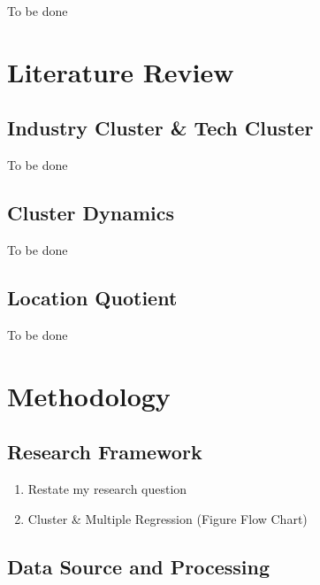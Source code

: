 \documentclass[
  12pt,
  oneside]{book}
\providecommand{\tightlist}{%
  \setlength{\itemsep}{0pt}\setlength{\parskip}{0pt}}
\begin{document}
To be done

\hypertarget{lit_review}{%
\chapter{Literature Review}\label{lit_review}}

\hypertarget{industry-cluster-tech-cluster}{%
\section{Industry Cluster \& Tech Cluster}\label{industry-cluster-tech-cluster}}

To be done

\hypertarget{cluster-dynamics}{%
\section{Cluster Dynamics}\label{cluster-dynamics}}

To be done

\hypertarget{location-quotient}{%
\section{Location Quotient}\label{location-quotient}}

To be done

\hypertarget{methodology}{%
\chapter{Methodology}\label{methodology}}

\hypertarget{research-framework}{%
\section{Research Framework}\label{research-framework}}

\begin{enumerate}
\def\labelenumi{\arabic{enumi}.}
\tightlist
\item
  Restate my research question
\item
  Cluster \& Multiple Regression
  (Figure Flow Chart)
\end{enumerate}

\hypertarget{data-source-and-processing}{%
\section{Data Source and Processing}\label{data-source-and-processing}}
\end{document}
